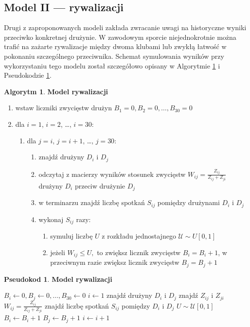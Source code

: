 \documentclass[inzynierska]{pwr_wmat_praca_dyplomowa}
\theoremstyle{plain}
\numberwithin{theorem}{chapter}
\theoremstyle{definition}
\numberwithin{theorem}{chapter}
\newtheorem{algorytm}[theorem]{Algorytm}
\newtheorem{pseudokod}[theorem]{Pseudokod}
\begin{document}
\subsection{Model II --- rywalizacji}
Drugi z zaproponowanych modeli zakłada zwracanie uwagi na historyczne wyniki przeciwko konkretnej drużynie. W zawodowym sporcie niejednokrotnie można trafić na zażarte rywalizacje między dwoma klubami lub zwykłą łatwość w pokonaniu szczególnego przeciwnika. Schemat symulowania wyników przy wykorzystaniu tego modelu został szczegółowo opisany w Algorytmie \ref{algorytm2} i Pseudokodzie \ref{pseudokod2}.

\begin{algorytm} \label{algorytm2}
	\textbf{Model rywalizacji}
	\begin{enumerate}
		\item wstaw liczniki zwycięstw drużyn $B_1= 0,B_2= 0,\dots, B_{30}= 0$
		\item dla $i=1$, $i=2$, \dots, $i=30$: 
		\begin{enumerate}
			\item dla $j=i$, $j=i+1$, \dots, $j=30$: 
			\begin{enumerate}
				\item znajdź drużyny $D_i$ i $D_j$
				\item odczytaj z macierzy wyników stosunek zwycięstw $W_{ij}=\frac{Z_{ij}}{Z_{ij}+Z_{ji}}$ drużyny $D_i$ przeciw drużynie $D_j$   
				\item w terminarzu znajdź liczbę spotkań $S_{ij}$ pomiędzy drużynami $D_i$ i $D_j$
				\item wykonaj $S_{ij}$ razy:
				\begin{enumerate}
					\item symuluj liczbę $U$ z rozkładu jednostajnego $\mathcal{U}\sim U[0,1]$ 
					\item jeżeli $W_{ij} \leq U,$ to zwiększ licznik zwycięstw $B_i=B_i+1$, w przeciwnym razie zwiększ licznik zwycięstw $B_j=B_j+1$
				\end{enumerate}
			\end{enumerate}
		\end{enumerate}
	\end{enumerate}
\end{algorytm} 

\begin{pseudokod} \label{pseudokod2}
	\textbf{Model rywalizacji}
	\begin{algorithmic}[1]
		\State $B_i\gets 0,B_j\gets 0,\dots, B_{30}\gets 0$
		\State $i\gets 1$
		\State znajdź drużyny $D_i$ i $D_j$
		\State znajdź $Z_{ij}$ i $Z_{ji}$ 
		\State $W_{ij}=\frac{Z_{ij}}{Z_{ij}+Z_{ji}}$
		\State znajdź liczbę spotkań $S_{ij}$ pomiędzy $D_i$ i $D_j$
		\State $U\sim \mathcal{U}[0,1]$
		\State $B_i \gets B_i+1$
		\Else
		\State $B_j \gets B_j+1$
		\EndIf
		\EndFor
		\EndFor
		\State $i\gets i+1$
		\EndWhile
	\end{algorithmic}
\end{pseudokod}
\end{document}
